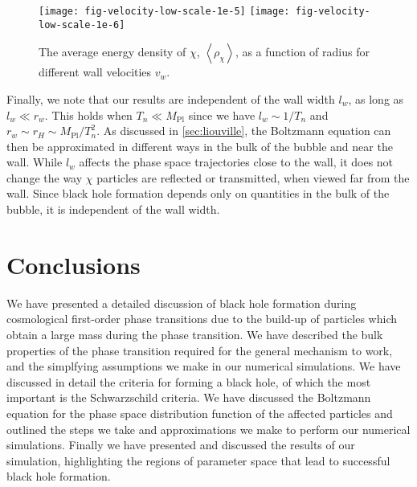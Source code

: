 \documentclass[
onecolumn, %
11pt, %
tightenlines,
superscriptaddress, %
nofootinbib, %
preprintnumbers, %
prd %
]{revtex4-1}
\newcommand{\ev}[1]{\ensuremath{\left\langle #1 %
        \right\rangle}} %
\begin{document}
\begin{figure}
    \centering
    \texttt{[image: fig-velocity-low-scale-1e-5]}\hfill
    \texttt{[image: fig-velocity-low-scale-1e-6]}
    \caption{
    The average energy density of $\chi$, $\ev{\rho_\chi}$, as a function of radius for different wall velocities $v_w$.
    }
    \label{fig:rho-wall-velocity}
\end{figure}

Finally, we note that our results are independent of the wall width $l_w$, as long as $l_w \ll r_w$. This holds when $T_n \ll M_\text{Pl}$ since we have $l_w \sim 1/T_n$ and $r_w \sim r_H \sim M_\text{Pl}/T_n^2$. As discussed in \cref{sec:liouville}, the Boltzmann equation can then be approximated in different ways in the bulk of the bubble and near the wall.  While $l_w$ affects the phase space trajectories close to the wall, it does not change the way $\chi$ particles are reflected or transmitted, when viewed far from the wall.  Since black hole formation depends only on quantities in the bulk of the bubble, it is independent of the wall width.


\section{Conclusions}
\label{sec:conclusions}

We have presented a detailed discussion of black hole formation during cosmological first-order phase transitions due to the build-up of particles which obtain a large mass during the phase transition.  We have described the bulk properties of the phase transition required for the general mechanism to work, and the simplfying assumptions we make in our numerical simulations.  We have discussed in detail the criteria for forming a black hole, of which the most important is the Schwarzschild criteria.  We have discussed the Boltzmann equation for the phase space distribution function of the affected particles and outlined the steps we take and approximations we make to perform our numerical simulations.  Finally we have presented and discussed the results of our simulation, highlighting the regions of parameter space that lead to successful black hole formation.
\end{document}
